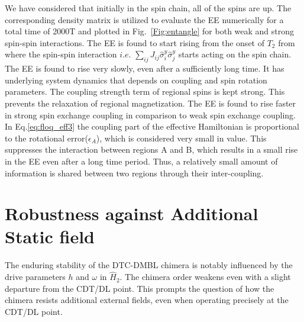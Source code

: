\documentclass[%
reprint,
superscriptaddress,
amsmath,amssymb,showkeys,
aps,
prb,
]{revtex4-2}
\begin{document}
	We have considered that initially in the spin chain, all of the spins are up. The corresponding density matrix is utilized to evaluate the EE numerically for a total time of 2000T and  plotted in Fig.~\ref{Fig:entangle} for both weak and strong spin-spin interactions. The EE is found to start rising from the onset of $T_2$ from where the spin-spin interaction $\textit{i.e.}$  $\displaystyle \sum_{ij}J_{ij}\hat{\sigma}^y_i\hat{\sigma}^y_j$ starts acting on the spin chain. The EE is found to rise very slowly, even after a sufficiently long time. It has underlying system dynamics that depends on coupling and spin rotation parameters. The coupling strength term of regional spins is kept strong. This prevents the relaxation of regional magnetization. The EE is found to rise faster in strong spin exchange coupling in comparison to weak spin exchange coupling. In Eq.\eqref{eq:floq_eff3} the coupling part of the effective Hamiltonian is proportional to the rotational error($\epsilon_A$), which is considered very small in value. This suppresses the interaction between regions A and B, which results in a small rise in the EE even after a long time period. Thus, a relatively small amount of information is shared between two regions through their inter-coupling.
	
	\section{\label{sec:level6} Robustness against Additional Static field}
	
	
	The enduring stability of the DTC-DMBL chimera is notably influenced by the drive parameters $h$ and $\omega$ in $\hat{H}_2$. The chimera order weakens even with a slight departure from the CDT/DL point. This prompts the question of how the chimera resists additional external fields, even when operating precisely at the CDT/DL point.
	
\end{document}
